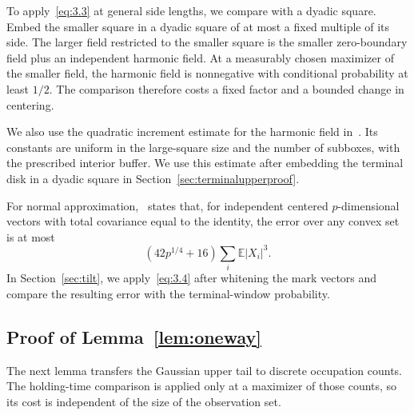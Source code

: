 \documentclass[11pt,letterpaper,reqno]{amsart}
\numberwithin{equation}{section}
\theoremstyle{remark}
\begin{document}
To apply~\eqref{eq:3.3} at general side lengths, we compare with a dyadic square. Embed the smaller square in a dyadic square of at most a fixed multiple of its side. The larger field restricted to the smaller square is the smaller zero-boundary field plus an independent harmonic field. At a measurably chosen maximizer of the smaller field, the harmonic field is nonnegative with conditional probability at least $1/2$. The comparison therefore costs a fixed factor and a bounded change in centering.

We also use the quadratic increment estimate for the harmonic field in~\cite[Lemma 3.10, equation (45)]{BDZ}. Its constants are uniform in the large-square size and the number of subboxes, with the prescribed interior buffer. We use this estimate after embedding the terminal disk in a dyadic square in Section~\ref{sec:terminalupperproof}.

For normal approximation,~\cite[Theorem 1.1]{BE} states that, for independent centered $p$-dimensional vectors with total covariance equal to the identity, the error over any convex set is at most
\begin{equation}\label{eq:3.4}
(42p^{1/4}+16)\sum_i\mathbb E|X_i|^3.
\end{equation}
In Section~\ref{sec:tilt}, we apply~\eqref{eq:3.4} after whitening the mark vectors and compare the resulting error with the terminal-window probability.

\subsection{Proof of Lemma~\ref{lem:oneway}}\label{sec:oneway}
The next lemma transfers the Gaussian upper tail to discrete occupation counts. The holding-time comparison is applied only at a maximizer of those counts, so its cost is independent of the size of the observation set.
\end{document}
